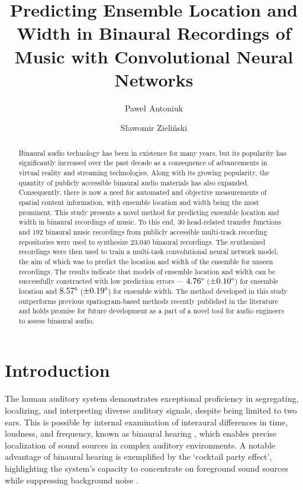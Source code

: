 \documentclass{article}
\title{Predicting Ensemble Location and Width in Binaural Recordings of Music with Convolutional Neural Networks}
\author[1,*]{Paweł Antoniuk}
\author[1]{Sławomir Zieliński}
\affil[1]{Faculty of Computer Science, Białystok University of Technology}
\affil[*]{Corresponding author: pawel.antoniuk@sd.pb.edu.pl}
\date{}
\begin{document}
\maketitle


\begin{abstract}
  Binaural audio technology has been in existence for many years, but its popularity has significantly increased over the past decade as a consequence of advancements in virtual reality and streaming technologies. Along with its growing popularity, the quantity of publicly accessible binaural audio materials has also expanded. Consequently, there is now a need for automated and objective measurements of spatial content information, with ensemble location and width being the most prominent. This study presents a novel method for predicting ensemble location and width in binaural recordings of music. To this end, 30 head-related transfer functions and 192 binaural music recordings from publicly accessible multi-track recording repositories were used to synthesize 23,040 binaural recordings. The synthesized recordings were then used to train a multi-task convolutional neural network model, the aim of which was to predict the location and width of the ensemble for unseen recordings. The results indicate that models of ensemble location and width can be successfully constructed with low prediction errors --- $4.76\degree$ ($\pm0.10\degree$) for ensemble location and $8.57\degree$ ($\pm0.19\degree$) for ensemble width. The method developed in this study outperforms previous spatiogram-based methods recently published in the literature and holds promise for future development as a part of a novel tool for audio engineers to assess binaural audio.
\end{abstract}

\section{Introduction}

The human auditory system demonstrates exceptional proficiency in segregating, localizing, and interpreting diverse auditory signals, despite being limited to two ears. This is possible by internal examination of interaural differences in time, loudness, and frequency, known as binaural hearing \parencite{blauert_spatial_1996}, which enables precise localization of sound sources in complex auditory environments. A notable advantage of binaural hearing is exemplified by the `cocktail party effect', highlighting the system's capacity to concentrate on foreground sound sources while suppressing background noise \parencite{cherry_experiments_1953}. 
\end{document}
